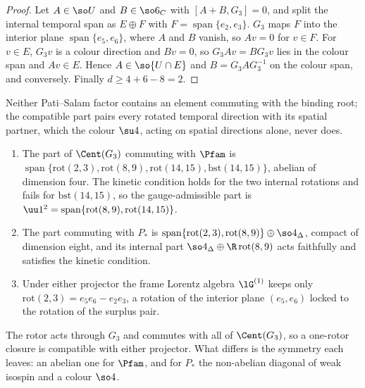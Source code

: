\begin{proof}
Let $A\in\so U$ and $B\in\so6_C$ with $[A+B,G_3]=0$, and split the internal temporal span as $E\oplus F$ with $F=\operatorname{span}\{e_2,e_3\}$. $G_3$ maps
$F$ into the interior plane $\operatorname{span}\{e_5,e_6\}$, where $A$ and $B$ vanish, so $Av=0$ for $v\in F$. For $v\in E$, $G_3v$ is a colour direction
and $Bv=0$, so $G_3Av=BG_3v$ lies in the colour span and $Av\in E$. Hence $A\in\so{U\cap E}$ and $B=G_3AG_3^{-1}$ on the colour span, and conversely.
Finally $d\ge4+6-8=2$.
\end{proof}

Neither Pati--Salam factor contains an element commuting with the binding root; the compatible part pairs every rotated temporal direction with
its spatial partner, which the colour $\su4$, acting on spatial directions alone, never does.

\begin{theorem}
\label{thm:survive}
\begin{enumerate}[label=(\roman*),leftmargin=2.2em]
\item The part of $\Cent(G_3)$ commuting with $\Pfam$ is $\operatorname{span}\{\mathrm{rot}(2,3),\mathrm{rot}(8,9),\mathrm{rot}(14,15),\mathrm{bst}(14,15)\}$,
abelian of dimension four. The kinetic condition holds for the two internal rotations and fails for $\mathrm{bst}(14,15)$, so the gauge-admissible
part is $\uu1^2=\operatorname{span}\{\mathrm{rot}(8,9),\mathrm{rot}(14,15)\}$.
\item The part commuting with $P_*$ is $\operatorname{span}\{\mathrm{rot}(2,3),\mathrm{rot}(8,9)\}\oplus\so4_\Delta$, compact of dimension eight, and its
internal part $\so4_\Delta\oplus\R\,\mathrm{rot}(8,9)$ acts faithfully and satisfies the kinetic condition.
\item Under either projector the frame Lorentz algebra $\lG^{(1)}$ keeps only $\mathrm{rot}(2,3)=e_5e_6-e_2e_3$, a rotation of the interior plane
$(e_5,e_6)$ locked to the rotation of the surplus pair.
\end{enumerate}
\end{theorem}

The rotor acts through $G_3$ and commutes with all of $\Cent(G_3)$, so a one-rotor closure is compatible with either projector. What differs is the
symmetry each leaves: an abelian one for $\Pfam$, and for $P_*$ the non-abelian diagonal of weak isospin and a colour $\so4$.

